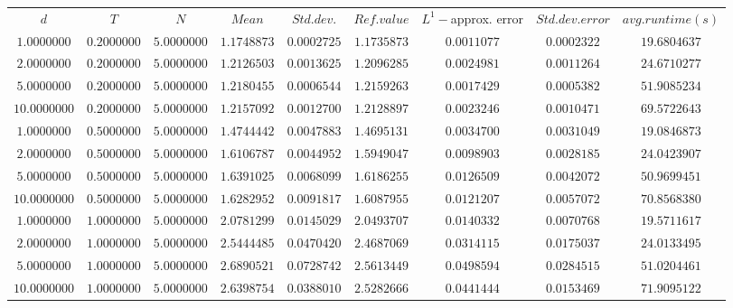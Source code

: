 \begin{tabular}{ccccccccc}
$d$ & $T$ & $N$ & $Mean$ & $Std. dev.$ & $Ref. value$ & $L^1-$approx. error & $Std. dev. error$ & $avg. runtime (s)$\\
$1.0000000$ & $0.2000000$ & $5.0000000$ & $1.1748873$ & $0.0002725$ & $1.1735873$ & $0.0011077$ & $0.0002322$ & $19.6804637$\\
$2.0000000$ & $0.2000000$ & $5.0000000$ & $1.2126503$ & $0.0013625$ & $1.2096285$ & $0.0024981$ & $0.0011264$ & $24.6710277$\\
$5.0000000$ & $0.2000000$ & $5.0000000$ & $1.2180455$ & $0.0006544$ & $1.2159263$ & $0.0017429$ & $0.0005382$ & $51.9085234$\\
$10.0000000$ & $0.2000000$ & $5.0000000$ & $1.2157092$ & $0.0012700$ & $1.2128897$ & $0.0023246$ & $0.0010471$ & $69.5722643$\\
$1.0000000$ & $0.5000000$ & $5.0000000$ & $1.4744442$ & $0.0047883$ & $1.4695131$ & $0.0034700$ & $0.0031049$ & $19.0846873$\\
$2.0000000$ & $0.5000000$ & $5.0000000$ & $1.6106787$ & $0.0044952$ & $1.5949047$ & $0.0098903$ & $0.0028185$ & $24.0423907$\\
$5.0000000$ & $0.5000000$ & $5.0000000$ & $1.6391025$ & $0.0068099$ & $1.6186255$ & $0.0126509$ & $0.0042072$ & $50.9699451$\\
$10.0000000$ & $0.5000000$ & $5.0000000$ & $1.6282952$ & $0.0091817$ & $1.6087955$ & $0.0121207$ & $0.0057072$ & $70.8568380$\\
$1.0000000$ & $1.0000000$ & $5.0000000$ & $2.0781299$ & $0.0145029$ & $2.0493707$ & $0.0140332$ & $0.0070768$ & $19.5711617$\\
$2.0000000$ & $1.0000000$ & $5.0000000$ & $2.5444485$ & $0.0470420$ & $2.4687069$ & $0.0314115$ & $0.0175037$ & $24.0133495$\\
$5.0000000$ & $1.0000000$ & $5.0000000$ & $2.6890521$ & $0.0728742$ & $2.5613449$ & $0.0498594$ & $0.0284515$ & $51.0204461$\\
$10.0000000$ & $1.0000000$ & $5.0000000$ & $2.6398754$ & $0.0388010$ & $2.5282666$ & $0.0441444$ & $0.0153469$ & $71.9095122$\\
\end{tabular}
